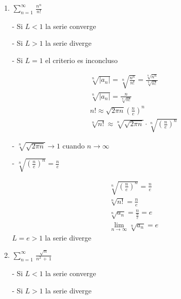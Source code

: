 \documentclass{article}
\begin{document}
\begin{enumerate}
\begin{enumerate}
- $\sqrt[n]{\left(\frac{n}{e}\right)^n}=\frac{n}{e}$
por lo tanto
$$
\begin{gathered}
\sqrt[n]{n!}=\frac{n}{e} \\
\sqrt[n]{\left|a_n\right|}=\frac{\sqrt[n]{10^{100 n}}}{\sqrt[n]{n!}} \approx \frac{10^{100}}{\frac{n}{e}}=\frac{10^{100} e}{n}
\end{gathered}
$$

Tomamos el límite cuando $n \rightarrow \infty$
$$
\lim _{n \rightarrow \infty} \sqrt[n]{\left|a_n\right|}=\lim _{n \rightarrow \infty} \frac{10^{100} e}{n}=0
$$

Dado que $L=0<1$ la serie converge
\newpage

\item $\displaystyle\sum_{n=1}^{\infty}\,\frac{n^n}{n!}$

- Si $L<1$ la serie converge

- Si $L>1$ la serie diverge

- Si $L=1$ el criterio es inconcluso

$$
\begin{gathered}
\sqrt[n]{\left|a_n\right|}=\sqrt[n]{\frac{n^n}{n!}}=\frac{\sqrt[n]{n^n}}{\sqrt[n]{n!}} \\
\sqrt[n]{\left|a_n\right|}=\frac{n}{\sqrt[n]{n!}} \\
n!\approx \sqrt{2 \pi n}\left(\frac{n}{e}\right)^n \\
\sqrt[n]{n!} \approx \sqrt[n]{\sqrt{2 \pi n}} \cdot \sqrt[n]{\left(\frac{n}{e}\right)^n}
\end{gathered}
$$

- $\sqrt[n]{\sqrt{2 \pi n}} \rightarrow 1$ cuando $n \rightarrow \infty$

- $\sqrt[n]{\left(\frac{n}{e}\right)^n}=\frac{n}{e}$

$$
\begin{gathered}
\sqrt[n]{\left(\frac{n}{e}\right)^n}=\frac{n}{e} \\
\sqrt[n]{n!}=\frac{n}{e} \\
\sqrt[n]{a_n}=\frac{n}{\frac{n}{e}}=e \\
\lim _{n \rightarrow \infty} \sqrt[n]{a_n}=e
\end{gathered}
$$
$L=e>1$ la serie diverge

\newpage

\item $\displaystyle\sum_{n=1}^{\infty}\,\frac{\sqrt{n}}{n^2\,+\,1}$

- Si $L<1$ la serie converge

- Si $L>1$ la serie diverge


\end{enumerate}
\end{enumerate}
\end{document}
